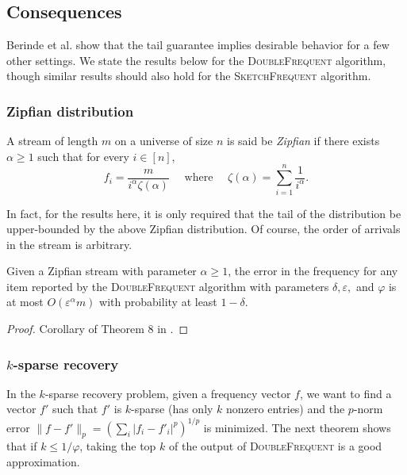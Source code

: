 \documentclass[sigconf,review=true,anonymous=true,screen]{acmart}
\newcommand{\eps}{\varepsilon}
\begin{document}
\subsection{Consequences}
Berinde et al. \cite{BCIS} show that the tail guarantee implies desirable behavior for a few other settings. We
state the results below for the \textsc{DoubleFrequent} algorithm, though similar results should also hold for
the \textsc{SketchFrequent} algorithm.

\subsubsection{Zipfian distribution}
A stream of length $m$ on a universe of size $n$ is said
be {\em Zipfian} if there exists $\alpha \geq 1$ such that for every
$i \in [n]$,
$$f_i =\frac{m}{i^\alpha \zeta(\alpha)} \quad \text{ where }	 \quad \zeta(\alpha)=\sum_{i=1}^n \frac{1}{i^\alpha}.$$

In fact, for the results here, it is only required that
the tail of the distribution be upper-bounded by the
above Zipfian distribution. Of course, the order of
arrivals in the stream is arbitrary.
\begin{theorem}Given a Zipfian stream with parameter
$\alpha\geq 1$, the error in the frequency for any item reported by the \textsc{DoubleFrequent} algorithm with parameters $\delta, \eps,$ and $\varphi$ is at most 
$O(\eps^\alpha m)$ with probability at least $1 -\delta$.
\end{theorem}
\begin{proof}
Corollary of Theorem 8 in \cite{BCIS}.
\end{proof}
\subsubsection{$k$-sparse recovery}
In the $k$-sparse recovery problem, given a frequency
vector $f$, we want to find a vector $f'$
such that $f'$ is
$k$-sparse (has only $k$ nonzero entries) and the $p$-norm
error $\|f - f'\|_p = (\sum_i |f_i - f'_i|^p)^{1/p}$ is minimized.
The next theorem shows that if $k \leq 1/\varphi$, taking the
top $k$ of the output of \textsc{DoubleFrequent} is a good
approximation.
\end{document}

